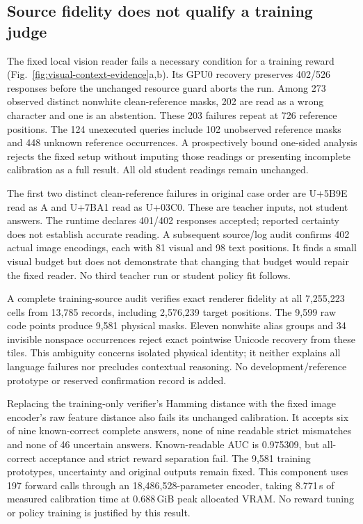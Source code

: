 \documentclass[12pt,a4paper]{article}
\providecommand{\DIFadd}[1]{{\protect\color{blue} \sf #1}} %
\begin{document}
\subsection*{\DIFadd{Source fidelity does not qualify a training judge}}

\DIFadd{The fixed local vision reader fails a necessary condition for a training
reward (Fig.~\ref{fig:visual-context-evidence}a,b). Its GPU0 recovery preserves
402/526 responses before the unchanged resource guard aborts the run. Among
273 observed distinct nonwhite clean-reference masks, 202 are read as a wrong
character and one is an abstention. These 203 failures repeat at 726 reference
positions. The 124 unexecuted queries include 102 unobserved reference masks
and 448 unknown reference occurrences. A prospectively bound one-sided analysis
rejects the fixed setup without imputing those readings or presenting incomplete
calibration as a full result. All old student readings remain unchanged.
}

\DIFadd{The first two distinct clean-reference failures in original case order are
U+5B9E read as A and U+7BA1 read as U+03C0. These are teacher inputs, not student
answers. The runtime declares 401/402 responses accepted; reported certainty
does not establish accurate reading. A subsequent source/log audit confirms
402 actual image encodings, each with 81 visual and 98 text positions. It finds
a small visual budget but does not demonstrate that changing that budget would
repair the fixed reader. No third teacher run or student policy fit follows.
}

\DIFadd{A complete training-source audit verifies exact renderer fidelity at all
7,255,223 cells from 13,785 records, including 2,576,239 target positions.
The 9,599 raw code points produce 9,581 physical masks. Eleven nonwhite alias
groups and 34 invisible nonspace occurrences reject exact pointwise Unicode
recovery from these tiles. This ambiguity concerns isolated physical identity;
it neither explains all language failures nor precludes contextual reasoning.
No development/reference prototype or reserved confirmation record is added.
}

\DIFadd{Replacing the training-only verifier's Hamming distance with the fixed image
encoder's raw feature distance also fails its unchanged calibration. It accepts
six of nine known-correct complete answers, none of nine readable strict
mismatches and none of 46 uncertain answers. Known-readable AUC is 0.975309,
but all-correct acceptance and strict reward separation fail. The 9,581 training
prototypes, uncertainty and original outputs remain fixed. This component uses
197 forward calls through an 18,486,528-parameter encoder, taking 8.771\,s of
measured calibration time at 0.688\,GiB peak allocated VRAM. No reward tuning
or policy training is justified by this result.
}
\end{document}

